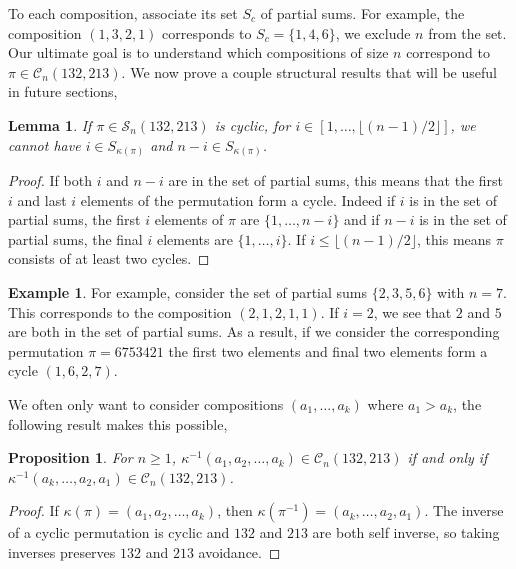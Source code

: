 \documentclass[11pt]{article}
\renewcommand\S{\mathcal S}
\newcommand\C{\mathcal C}
\newtheorem{lemma}[theorem]{Lemma}
\newtheorem{proposition}[theorem]{Proposition}
\theoremstyle{definition}
\newtheorem{example}[theorem]{Example}
\begin{document}
To each composition, associate its set $S_c$ of partial sums. For example, the composition $(1,3,2,1)$ corresponds to $S_c = \{1,4,6\}$, we exclude $n$ from the set. Our ultimate goal is to understand which compositions of size $n$ correspond to $\pi \in \C_n(132,213)$. We now prove a couple structural results that will be useful in future sections,

\begin{lemma} \label{lem: balance}
    If $\pi \in \S_n(132,213)$ is cyclic, for $i \in [1,\dots,\lfloor (n-1)/2 \rfloor]$, we cannot have $i \in S_{\kappa(\pi)}$ and $n-i \in S_{\kappa(\pi)}$.
\end{lemma}

\begin{proof}
    If both $i$ and $n-i$ are in the set of partial sums, this means that the first $i$ and last $i$ elements of the permutation form a cycle. Indeed if $i$ is in the set of partial sums, the first $i$ elements of $\pi$ are $\{1,\dots,n-i\}$ and if $n-i$ is in the set of partial sums, the final $i$ elements are $\{1,\dots,i\}$. If $i \leq \lfloor (n-1)/2 \rfloor$, this means $\pi$ consists of at least two cycles.
\end{proof}

\begin{example}
    For example, consider the set of partial sums $\{2,3,5,6\}$ with $n = 7$. This corresponds to the composition $(2,1,2,1,1)$. If $i = 2$, we see that $2$ and $5$ are both in the set of partial sums. As a result, if we consider the corresponding permutation $\pi = 6753421$ the first two elements and final two elements form a cycle $(1,6,2,7)$.
\end{example}

We often only want to consider compositions $(a_1,\dots,a_k)$ where $a_1 > a_k$, the following result makes this possible,

\begin{proposition} \label{prop: reverse}
    For $n \geq 1$, $\kappa^{-1}(a_1,a_2,\dots,a_k) \in \C_n(132,213)$ if and only if $\kappa^{-1}(a_k,\dots,a_2,a_1) \in \C_n(132,213)$.
\end{proposition}

\begin{proof}
    If $\kappa(\pi) = (a_1,a_2,\dots,a_k)$, then $\kappa(\pi^{-1}) = (a_k,\dots,a_2,a_1)$. The inverse of a cyclic permutation is cyclic and $132$ and $213$ are both self inverse, so taking inverses preserves $132$ and $213$ avoidance.
\end{proof}
\end{document}
